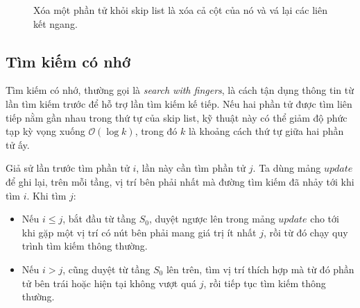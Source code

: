 \documentclass[11pt]{article}
\newcommand{\Oh}{\mathcal{O}}
\begin{document}
\begin{figure}[ht]
\centering
{}
\caption{Xóa một phần tử khỏi skip list là xóa cả cột của nó và vá lại các liên kết ngang.}
\end{figure}

\subsection{Tìm kiếm có nhớ}

Tìm kiếm có nhớ, thường gọi là \emph{search with fingers}, là cách tận dụng
thông tin từ lần tìm kiếm trước để hỗ trợ lần tìm kiếm kế tiếp. Nếu hai phần
tử được tìm liên tiếp nằm gần nhau trong thứ tự của skip list, kỹ thuật này
có thể giảm độ phức tạp kỳ vọng xuống \(\Oh(\log k)\), trong đó \(k\) là
khoảng cách thứ tự giữa hai phần tử ấy.

Giả sử lần trước tìm phần tử \(i\), lần này cần tìm phần tử \(j\). Ta dùng
mảng \(\textit{update}\) để ghi lại, trên mỗi tầng, vị trí bên phải nhất mà
đường tìm kiếm đã nhảy tới khi tìm \(i\). Khi tìm \(j\):
\begin{itemize}
  \item Nếu \(i\le j\), bắt đầu từ tầng \(S_0\), duyệt ngược lên trong mảng
  \(\textit{update}\) cho tới khi gặp một vị trí có nút bên phải mang giá trị
  ít nhất \(j\), rồi từ đó chạy quy trình tìm kiếm thông thường.
  \item Nếu \(i>j\), cũng duyệt từ tầng \(S_0\) lên trên, tìm vị trí thích hợp
  mà từ đó phần tử bên trái hoặc hiện tại không vượt quá \(j\), rồi tiếp tục
  tìm kiếm thông thường.
\end{itemize}
\end{document}
